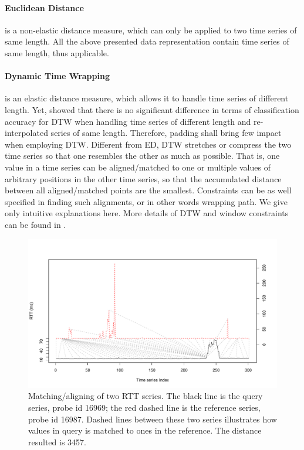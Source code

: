 \paragraph*{Euclidean Distance} is a non-elastic distance measure, which can only be applied to two time series of same length. All the above presented data representation contain time series of same length, thus applicable.

\paragraph*{Dynamic Time Wrapping} is an elastic distance measure, which allows it to handle time series of different length. Yet, \citet{Ratanamahatana2005} showed that there is no significant difference in terms of classification accuracy for \ac{DTW} when handling time series of different length and re-interpolated series of same length. 
Therefore, padding shall bring few impact when employing \ac{DTW}.
Different from ED, \ac{DTW} stretches or compress the two time series so that one resembles the other as much as possible. That is, one value in a time series can be aligned/matched to one or multiple values of arbitrary positions in the other time series, so that the accumulated distance between all aligned/matched points are the smallest. Constraints can be as well specified in finding such alignments, or in other words wrapping path.
We give only intuitive explanations here.
More details of \ac{DTW} and window constraints can be found in \cite{Sakoe1978, Keogh2005, Giorgino2009}.

\begin{figure}[!htb]
\centering
\includegraphics[width=.8\textwidth]{gfx/chap3/dtw_ex.pdf}
\caption{Matching/aligning of two RTT series. The black line is the query series, probe id 16969; the red dashed line is the reference series, probe id 16987. Dashed lines between these two series illustrates how values in query is matched to ones in the reference. The distance resulted is 3457.}
\label{fig:dtw_ex}
\end{figure}

